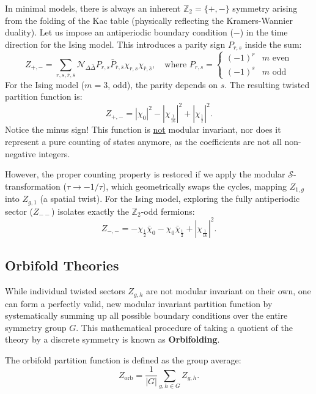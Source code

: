 \begin{example}
    In minimal models, there is always an inherent \(\mathbb{Z}_2 = \{+, -\}\) symmetry arising from the folding of the Kac table (physically reflecting the Kramers-Wannier duality). Let us impose an antiperiodic boundary condition (\(-\)) in the time direction for the Ising model. This introduces a parity sign \(P_{r,s}\) inside the sum:
    \[
        Z_{+,-} = \sum_{r,s,\bar{r},\bar{s}} \mathcal{N}_{\Delta \bar{\Delta}} P_{r,s} \bar{P}_{\bar{r},\bar{s}} \chi_{r,s} \chi_{\bar{r},\bar{s}}, \quad \text{where } P_{r,s} = \begin{cases} (-1)^r & m \text{ even} \\ (-1)^s & m \text{ odd} \end{cases}
    \]
    For the Ising model (\(m=3\), odd), the parity depends on \(s\). The resulting twisted partition function is:
    \[
        Z_{+,-} = |\chi_0|^2 - \left|\chi_{\frac{1}{16}}\right|^2 + \left|\chi_{\frac{1}{2}}\right|^2.
    \]
    Notice the minus sign! This function is \uline{not} modular invariant, nor does it represent a pure counting of states anymore, as the coefficients are not all non-negative integers.

    However, the proper counting property is restored if we apply the modular \(\mathcal{S}\)-transformation (\(\tau \to -1/\tau\)), which geometrically swaps the cycles, mapping \(Z_{1,g}\) into \(Z_{g,1}\) (a spatial twist). For the Ising model, exploring the fully antiperiodic sector (\(Z_{--}\)) isolates exactly the \(\mathbb{Z}_2\)-odd fermions:
    \[
        Z_{-,-} = -\chi_{\frac{1}{2}}\bar{\chi}_0 - \chi_0\bar{\chi}_{\frac{1}{2}} + \left|\chi_{\frac{1}{16}}\right|^2.
    \]
\end{example}

\subsection{Orbifold Theories}

While individual twisted sectors \(Z_{g,h}\) are not modular invariant on their own, one can form a perfectly valid, new modular invariant partition function by systematically summing up all possible boundary conditions over the entire symmetry group \(G\). This mathematical procedure of taking a quotient of the theory by a discrete symmetry is known as \textbf{Orbifolding}.

The orbifold partition function is defined as the group average:
\[
    Z_{\mathrm{orb}} = \frac{1}{|G|} \sum_{g,h \in G} Z_{g,h}.
\]

